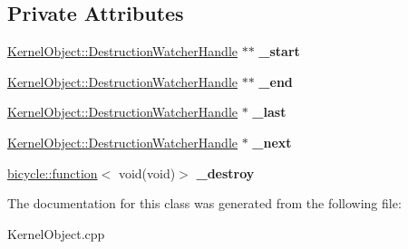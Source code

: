 \subsection*{Private Attributes}
\begin{DoxyCompactItemize}
\item 
\mbox{\label{class_kernel_object___internal_1_1_destruction_watcher_handle_ac7ea6e6fbd9c94f2ac9f00553caaa455}} 
\hyperlink{class_kernel_object_1_1_destruction_watcher_handle}{Kernel\+Object\+::\+Destruction\+Watcher\+Handle} $\ast$$\ast$ {\bfseries \+\_\+start}
\item 
\mbox{\label{class_kernel_object___internal_1_1_destruction_watcher_handle_ac2dc223fe682c6bfaa04207ee918e1c9}} 
\hyperlink{class_kernel_object_1_1_destruction_watcher_handle}{Kernel\+Object\+::\+Destruction\+Watcher\+Handle} $\ast$$\ast$ {\bfseries \+\_\+end}
\item 
\mbox{\label{class_kernel_object___internal_1_1_destruction_watcher_handle_a30d3f4a11a58e083c1e6511134847201}} 
\hyperlink{class_kernel_object_1_1_destruction_watcher_handle}{Kernel\+Object\+::\+Destruction\+Watcher\+Handle} $\ast$ {\bfseries \+\_\+last}
\item 
\mbox{\label{class_kernel_object___internal_1_1_destruction_watcher_handle_a592ff0484d078e959d8666c8814060b5}} 
\hyperlink{class_kernel_object_1_1_destruction_watcher_handle}{Kernel\+Object\+::\+Destruction\+Watcher\+Handle} $\ast$ {\bfseries \+\_\+next}
\item 
\mbox{\label{class_kernel_object___internal_1_1_destruction_watcher_handle_a16a94d405963ef9aa0ba855a2cc939c1}} 
\hyperlink{classbicycle_1_1function}{bicycle\+::function}$<$ void(void)$>$ {\bfseries \+\_\+destroy}
\end{DoxyCompactItemize}


The documentation for this class was generated from the following file\+:\begin{DoxyCompactItemize}
\item 
Kernel\+Object.\+cpp\end{DoxyCompactItemize}
